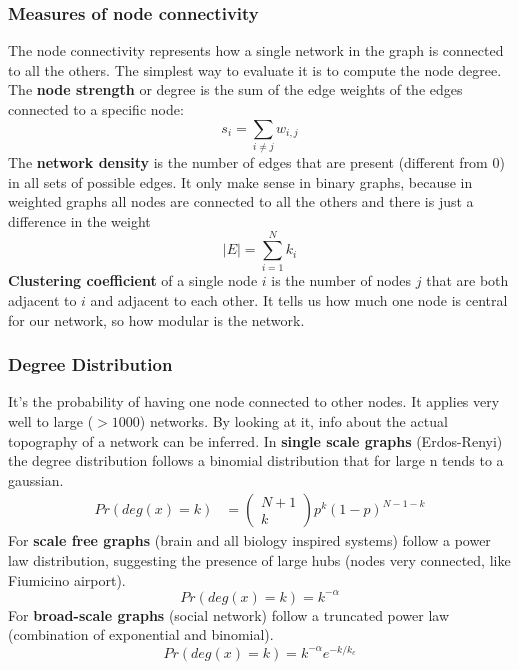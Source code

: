 \subsubsection{Measures of node connectivity}
The node connectivity represents how a single network in the graph is connected to all the others. The simplest way to evaluate it is to compute the node degree.\\
The \textbf{node strength} or degree is the sum of the edge weights of the edges connected to a specific node:
\begin{equation*}
    s_i=\sum_{i\neq j}w_{i,j}
\end{equation*}
The \textbf{network density} is the number of edges that are present (different from 0) in all sets of possible edges. It only make sense in binary graphs, because in weighted graphs all nodes are connected to all the others and there is just a difference in the weight
\begin{equation*}
    |E|=\sum_{i=1}^{N} k_i
\end{equation*}
\textbf{Clustering coefficient} of a single node \(i\) is the number of nodes \(j\) that are both adjacent to \(i\) and adjacent to each other. It tells us how much one node is central for our network, so how modular is the network.
\subsubsection{Degree Distribution}
It's the probability of having one node connected to other nodes.
It applies very well to large (\(>1000\)) networks. 
By looking at it, info about the actual topography of a network can be inferred.
In \textbf{single scale graphs} (Erdos-Renyi) the degree distribution follows a binomial distribution that for large n tends to a gaussian. 
\begin{align*}
    Pr(deg(x)=k) &= \begin{pmatrix}
    N+1 \\
    k
    \end{pmatrix}
    p^k(1-p)^{N-1-k}
\end{align*}
For \textbf{scale free graphs} (brain and all biology inspired systems) follow a power law distribution, suggesting the presence of large hubs (nodes very connected, like Fiumicino airport).
\begin{equation*}
    Pr(deg(x)=k)=k^{-\alpha}
\end{equation*}
For \textbf{broad-scale graphs} (social network) follow a truncated power law (combination of exponential and binomial).
\begin{equation*}
    Pr(deg(x)=k)=k^{-\alpha}e^{-k/k_c}
\end{equation*}
